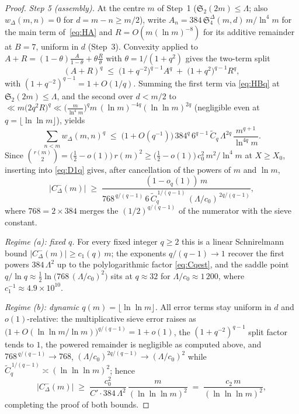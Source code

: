\documentclass[11pt]{article}
\theoremstyle{plain}
\theoremstyle{definition}
\newcommand{\rch}{r}
\begin{document}
\begin{proof}
\smallskip
\noindent\emph{Step 5 (assembly).} At the centre $m$ of Step~1
($\mathfrak{S}_2(2m) \le \Lambda$; also $w_\Delta(m,n) = 0$ for
$d = m - n \ge m/2$), write $A_n = 384\,\mathfrak{S}_4^{\Delta}(m,d)
\,m/\ln^{4} m$ for the main term of~\eqref{eq:HA} and
$R = O(m(\ln m)^{-8})$ for its additive remainder at $B = 7$,
uniform in $d$ (Step~3). Convexity applied to
$A + R = (1-\theta)\frac{A}{1-\theta} + \theta\frac{R}{\theta}$
with $\theta = 1/(1+q^{2})$ gives the two-term split
\[
(A+R)^{q} \;\le\; \bigl(1+q^{-2}\bigr)^{q-1} A^{q}
 \;+\; \bigl(1+q^{2}\bigr)^{q-1} R^{q},
\]
with $(1+q^{-2})^{q-1} = 1 + O(1/q)$. Summing the first term via
\eqref{eq:HBq} at $\mathfrak{S}_2(2m) \le \Lambda$, and the second
over $d < m/2$ to
$\ll m\bigl(2q^{2} R\bigr)^{q}
\ll \bigl(\frac{m}{\ln^{4} m}\bigr)^{q} m\,(\ln m)^{-4q}
(\ln\ln m)^{2q}$ (negligible even at $q = \lfloor\ln\ln m\rfloor$),
yields
\[
\sum_{n < m} w_\Delta(m,n)^{q}
 \;\le\; \bigl(1 + O(q^{-1})\bigr)\,
 384^{q}\, 6^{q-1}\,\widetilde C_q\,\Lambda^{2q}\,
 \frac{m^{q+1}}{\ln^{4q} m} .
\]
Since
$\binom{\rch(m)}{2} = \bigl(\tfrac{1}{2} - o(1)\bigr)\,\rch(m)^{2}
\ge \bigl(\tfrac{1}{2} - o(1)\bigr)\,c_0^{2}\,m^{2}/\ln^{4}m$ at
$X \ge X_0$, inserting into \eqref{eq:D1q} gives, after cancellation
of the powers of $m$ and $\ln m$,
\begin{equation}\label{eq:C1q}
\bigl|C_\Delta^{-}(m)\bigr|
 \;\ge\; \frac{(1 - o_q(1))\,m}
 {768^{\,q/(q-1)}\, 6\,\widetilde C_q^{\,1/(q-1)}\,
 (\Lambda/c_0)^{\,2q/(q-1)}} ,
\end{equation}
where $768 = 2 \times 384$ merges the $(1/2)^{q/(q-1)}$ of the
numerator with the sieve constant.

\emph{Regime (a): fixed $q$.} For every fixed integer $q \ge 2$
this is a linear Schnirelmann bound
$\bigl|C_\Delta^{-}(m)\bigr| \ge c_1(q)\,m$; the exponents
$q/(q-1) \to 1$ recover the first powers $384\,\Lambda^{2}$ up to
the polylogarithmic factor \eqref{eq:Cqest}, and the saddle point
$q/\ln q \approx \tfrac{1}{2}\ln\!\bigl(768\,(\Lambda/c_0)^{2}\bigr)$
sits at $q \approx 32$ for $\Lambda/c_0 \approx 1\,200$, where
$c_1^{-1} \approx 4.9\times 10^{10}$.

\emph{Regime (b): dynamic $q(m) = \lfloor \ln\ln m \rfloor$.} All
error terms stay uniform in $d$ and $o(1)$-relative: the
multiplicative sieve error raises as
$\bigl(1 + O(\ln\ln m/\ln m)\bigr)^{q/(q-1)} = 1 + o(1)$, the
$(1+q^{-2})^{q-1}$ split factor tends to $1$, the powered remainder
is negligible as computed above, and
$768^{\,q/(q-1)} \to 768$,
$(\Lambda/c_0)^{2q/(q-1)} \to (\Lambda/c_0)^{2}$ while
$\widetilde C_q^{\,1/(q-1)} \asymp (\ln\ln\ln m)^{2}$; hence
\[
\bigl|C_\Delta^{-}(m)\bigr|
 \;\ge\; \frac{c_0^{2}}{C'\cdot 384\,\Lambda^{2}}\,
 \frac{m}{(\ln\ln\ln m)^{2}}
 \;=\; \frac{c_2\,m}{(\ln\ln\ln m)^{2}} ,
\]
completing the proof of both bounds.
\end{proof}
\end{document}
